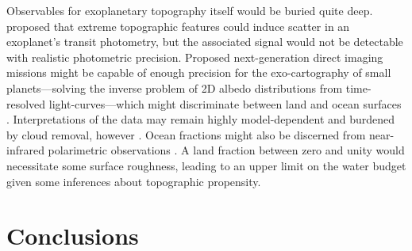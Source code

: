 Observables for exoplanetary topography itself would be buried quite deep. \citet{mctier_finding_2018} proposed that extreme topographic features could induce scatter in an exoplanet's transit photometry, but the associated signal would not be detectable with realistic photometric precision. Proposed next-generation direct imaging missions might be capable of enough precision for the exo-cartography of small planets---solving the inverse problem of 2D albedo distributions from time-resolved light-curves---which might discriminate between land and ocean surfaces \citep{cowan_mapping_2018, farr_exocartographer_2018, lustig-yaeger_detecting_2018, kawahara_global_2020, aizawa_global_2020}. Interpretations of the data may remain highly model-dependent and burdened by cloud removal, however \citep{paradise_fundamental_2021, teinturier_mapping_2022}. Ocean fractions might also be discerned from near-infrared polarimetric observations \citep{takahashi_polarimetric_2021}. A land fraction between zero and unity would necessitate some surface roughness, leading to an upper limit on the water budget given some inferences about topographic propensity. %






\section{Conclusions}


